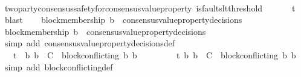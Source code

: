 \begin{isabellebody}
\ \ \ \ \isamarkupfalse%
\ two{\isacharunderscore}party{\isacharunderscore}consensus{\isacharunderscore}safety{\isacharunderscore}for{\isacharunderscore}consensus{\isacharunderscore}value{\isacharunderscore}property\ {\isacartoucheopen}is{\isacharunderscore}faults{\isacharunderscore}lt{\isacharunderscore}threshold\ {\isacharparenleft}{\isasymsigma}{}\ {\isasymunion}\ {\isasymsigma}{}{\isacharparenright}{\isacartoucheclose}\ {\isacartoucheopen}{\isacharbraceleft}{\isasymsigma}{}{\isacharcomma}\ {\isasymsigma}{}{\isacharbraceright}\ {\isasymsubseteq}\ {\isasymSigma}t{\isacartoucheclose}\ \isamarkupfalse%
\ blast\isanewline
\ \ \isamarkupfalse%
\ {\isachardoublequoteopen}block{\isacharunderscore}membership\ b{}\ {\isasymin}\ consensus{\isacharunderscore}value{\isacharunderscore}property{\isacharunderscore}decisions\ {\isasymsigma}{}{\isachardoublequoteclose}\isanewline
\ \ \ \ \isamarkupfalse%
\ {\isacartoucheopen}block{\isacharunderscore}membership\ b{}\ {\isasymin}\ consensus{\isacharunderscore}value{\isacharunderscore}property{\isacharunderscore}decisions\ {\isasymsigma}{}{\isacartoucheclose}\ \isanewline
\ \ \ \ \isamarkupfalse%
\ {\isacharparenleft}simp\ add{\isacharcolon}\ consensus{\isacharunderscore}value{\isacharunderscore}property{\isacharunderscore}decisions{\isacharunderscore}def{\isacharparenright}\isanewline
\ \ \isamarkupfalse%
\ {\isachardoublequoteopen}{\isasymsigma}{}\ {\isasymin}\ {\isasymSigma}t\ {\isasymand}\ {\isacharbraceleft}b{}{\isacharcomma}\ b{}{\isacharbraceright}\ {\isasymsubseteq}\ C\ {\isasymand}\ block{\isacharunderscore}conflicting\ {\isacharparenleft}b{}{\isacharcomma}\ b{}{\isacharparenright}{\isachardoublequoteclose}\isanewline
\ \ \ \ \isamarkupfalse%
\ {\isacartoucheopen}{\isacharbraceleft}{\isasymsigma}{}{\isacharcomma}\ {\isasymsigma}{}{\isacharbraceright}\ {\isasymsubseteq}\ {\isasymSigma}t{\isacartoucheclose}\ {\isacartoucheopen}{\isacharbraceleft}b{}{\isacharcomma}\ b{}{\isacharbraceright}\ {\isasymsubseteq}\ C\ {\isasymand}\ block{\isacharunderscore}conflicting\ {\isacharparenleft}b{}{\isacharcomma}\ b{}{\isacharparenright}{\isacartoucheclose}\ \isamarkupfalse%
\ {\isacharparenleft}simp\ add{\isacharcolon}\ block{\isacharunderscore}conflicting{\isacharunderscore}def{\isacharparenright}\isanewline

\end{isabellebody}

